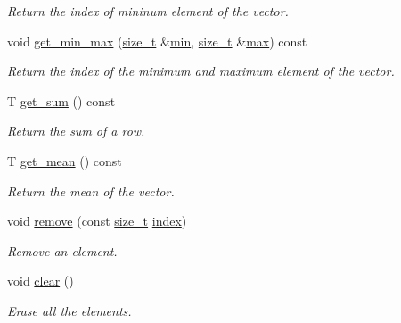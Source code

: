 \begin{DoxyCompactItemize}
\begin{DoxyCompactList}\small\item\em Return the index of mininum element of the vector. \end{DoxyCompactList}\item 
void \hyperlink{classAugmentedVector_acf2a88cd2abcdf96eed0277e9cfbd241}{get\+\_\+min\+\_\+max} (\hyperlink{tutorial__fpt__2017_2intro_2sixth_2test_8c_a7c94ea6f8948649f8d181ae55911eeaf}{size\+\_\+t} \&\hyperlink{tutorial__pact__2019_2Introduction_2sixth_2qsort_8c_abb702d8b501669a23aa0ab3b281b9384}{min}, \hyperlink{tutorial__fpt__2017_2intro_2sixth_2test_8c_a7c94ea6f8948649f8d181ae55911eeaf}{size\+\_\+t} \&\hyperlink{tutorial__pact__2019_2Target-Customization_2first_2hint_8c_a28f422940797ea297699ba55d89171c5}{max}) const
\begin{DoxyCompactList}\small\item\em Return the index of the minimum and maximum element of the vector. \end{DoxyCompactList}\item 
T \hyperlink{classAugmentedVector_a2eb88fec648538a49922dbcd0ef277ee}{get\+\_\+sum} () const
\begin{DoxyCompactList}\small\item\em Return the sum of a row. \end{DoxyCompactList}\item 
T \hyperlink{classAugmentedVector_a5d6d742b8f707dd25ed0ad75208a2444}{get\+\_\+mean} () const
\begin{DoxyCompactList}\small\item\em Return the mean of the vector. \end{DoxyCompactList}\item 
void \hyperlink{classAugmentedVector_aaab0ba673a617c1641ce90c9f92d1f0f}{remove} (const \hyperlink{tutorial__fpt__2017_2intro_2sixth_2test_8c_a7c94ea6f8948649f8d181ae55911eeaf}{size\+\_\+t} \hyperlink{tutorial__pact__2019_2Introduction_2third_2include_2Keccak_8h_a028c9bdc8344cca38ab522a337074797}{index})
\begin{DoxyCompactList}\small\item\em Remove an element. \end{DoxyCompactList}\item 
void \hyperlink{classAugmentedVector_ae793c7d0f31d40be20c10450c7b2fec6}{clear} ()
\begin{DoxyCompactList}\small\item\em Erase all the elements. \end{DoxyCompactList}\item 

\end{DoxyCompactItemize}
